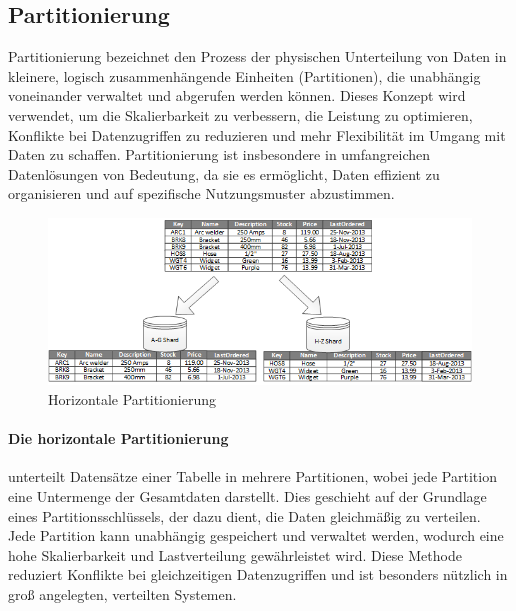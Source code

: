 
\subsection{Partitionierung}

Partitionierung bezeichnet den Prozess der physischen Unterteilung von Daten in kleinere, logisch zusammenhängende
Einheiten (Partitionen), die unabhängig voneinander verwaltet und abgerufen werden können.
Dieses Konzept wird verwendet, um die Skalierbarkeit zu verbessern, die Leistung zu optimieren, Konflikte
bei Datenzugriffen zu reduzieren und mehr Flexibilität im Umgang mit Daten zu schaffen.
Partitionierung ist insbesondere in umfangreichen Datenlösungen von Bedeutung, da sie es ermöglicht,
Daten effizient zu organisieren und auf spezifische Nutzungsmuster abzustimmen.

\begin{figure}[t]
  \centering
  \includegraphics[width=\linewidth]{../images/1}
  \caption{Horizontale Partitionierung~\cite{mic-datapart}}
    \label{fig:datapar}
\end{figure}

\paragraph{Die horizontale Partitionierung} unterteilt Datensätze einer Tabelle in mehrere Partitionen,
wobei jede Partition eine Untermenge der Gesamtdaten darstellt.
Dies geschieht auf der Grundlage eines Partitionsschlüssels, der dazu dient, die Daten gleichmäßig zu verteilen.
Jede Partition kann unabhängig gespeichert und verwaltet werden, wodurch eine hohe Skalierbarkeit und
Lastverteilung gewährleistet wird.
Diese Methode reduziert Konflikte bei gleichzeitigen Datenzugriffen und ist besonders nützlich in groß angelegten,
verteilten Systemen.
